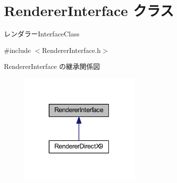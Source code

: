 \hypertarget{class_renderer_interface}{}\section{Renderer\+Interface クラス}
\label{class_renderer_interface}


レンダラー\+Interface\+Class  




{\ttfamily \#include $<$Renderer\+Interface.\+h$>$}



Renderer\+Interface の継承関係図
\nopagebreak
\begin{figure}[H]
\begin{center}
\leavevmode
\includegraphics[width=172pt]{class_renderer_interface__inherit__graph}
\end{center}
\end{figure}
